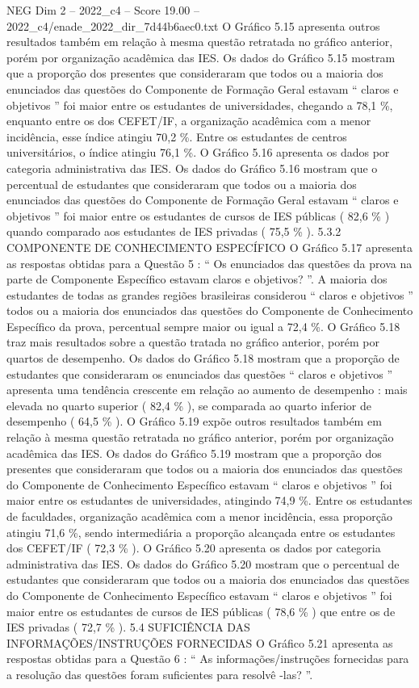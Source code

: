 \begin{textsample}{NEG Dim 2 – 2022\_c4 – Score 19.00 – 2022\_c4/enade\_2022\_dir\_7d44b6aec0.txt}
O Gráfico 5.15 apresenta outros resultados também em relação à mesma questão retratada no gráfico anterior, porém por organização acadêmica das IES.
Os dados do Gráfico 5.15 mostram que a proporção dos presentes que consideraram que todos ou a maioria dos enunciados das questões do Componente de Formação Geral estavam “ claros e objetivos ” foi maior entre os estudantes de universidades, chegando a 78,1 \%, enquanto entre os dos CEFET/IF, a organização acadêmica com a menor incidência, esse índice atingiu 70,2 \%.
Entre os estudantes de centros universitários, o índice atingiu 76,1 \%.
O Gráfico 5.16 apresenta os dados por categoria administrativa das IES.
Os dados do Gráfico 5.16 mostram que o percentual de estudantes que consideraram que todos ou a maioria dos enunciados das questões do Componente de Formação Geral estavam “ claros e objetivos ” foi maior entre os estudantes de cursos de IES públicas ( 82,6 \% ) quando comparado aos estudantes de IES privadas ( 75,5 \% ). 5.3.2 COMPONENTE DE CONHECIMENTO ESPECÍFICO O Gráfico 5.17 apresenta as respostas obtidas para a Questão 5 : “ Os enunciados das questões da prova na parte de Componente Específico estavam claros e objetivos? ”.
A maioria dos estudantes de todas as grandes regiões brasileiras considerou “ claros e objetivos ” todos ou a maioria dos enunciados das questões do Componente de Conhecimento Específico da prova, percentual sempre maior ou igual a 72,4 \%.
O Gráfico 5.18 traz mais resultados sobre a questão tratada no gráfico anterior, porém por quartos de desempenho.
Os dados do Gráfico 5.18 mostram que a proporção de estudantes que consideraram os enunciados das questões “ claros e objetivos ” apresenta uma tendência crescente em relação ao aumento de desempenho : mais elevada no quarto superior ( 82,4 \% ), se comparada ao quarto inferior de desempenho ( 64,5 \% ).
O Gráfico 5.19 expõe outros resultados também em relação à mesma questão retratada no gráfico anterior, porém por organização acadêmica das IES.
Os dados do Gráfico 5.19 mostram que a proporção dos presentes que consideraram que todos ou a maioria dos enunciados das questões do Componente de Conhecimento Específico estavam “ claros e objetivos ” foi maior entre os estudantes de universidades, atingindo 74,9 \%.
Entre os estudantes de faculdades, organização acadêmica com a menor incidência, essa proporção atingiu 71,6 \%, sendo intermediária a proporção alcançada entre os estudantes dos CEFET/IF ( 72,3 \% ).
O Gráfico 5.20 apresenta os dados por categoria administrativa das IES.
Os dados do Gráfico 5.20 mostram que o percentual de estudantes que consideraram que todos ou a maioria dos enunciados das questões do Componente de Conhecimento Específico estavam “ claros e objetivos ” foi maior entre os estudantes de cursos de IES públicas ( 78,6 \% ) que entre os de IES privadas ( 72,7 \% ). 5.4 SUFICIÊNCIA DAS INFORMAÇÕES/INSTRUÇÕES FORNECIDAS O Gráfico 5.21 apresenta as respostas obtidas para a Questão 6 : “ As informações/instruções fornecidas para a resolução das questões foram suficientes para resolvê -las? ”.

\end{textsample}
